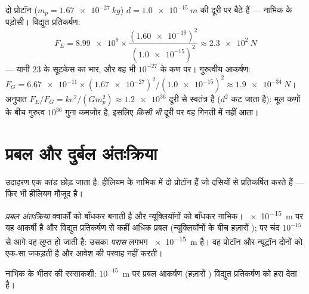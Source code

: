 \begin{example}[दो प्रोटॉन, दोनों बल एक साथ]\label{ex:g11:fundamental-interactions:protons}
दो प्रोटॉन ($m_p = \qty{1.67e-27}{kg}$) $d = \qty{1.0e-15}{m}$ की दूरी पर बैठे हैं --- नाभिक के पड़ोसी। विद्युत
प्रतिकर्षण:
\[
F_E = \num{8.99e9} \times
\frac{(\num{1.60e-19})^{2}}{(\num{1.0e-15})^{2}}
\approx \qty{2.3e2}{N}
\]
--- यानी $23$  के सूटकेस का भार, और वह भी $10^{-27}$
 के कण पर। गुरुत्वीय आकर्षण: $F_G = \num{6.67e-11} \times (\num{1.67e-27})^{2} /
(\num{1.0e-15})^{2} \approx \qty{1.9e-34}{N}$। अनुपात $F_E / F_G = k e^{2} / (G m_p^{2}) \approx \num{1.2e36}$ दूरी से
स्वतंत्र है ($d^{2}$ कट जाता है): मूल कणों के बीच गुरुत्व $10^{36}$ गुना कमज़ोर
है, इसलिए \emph{किसी भी} दूरी पर वह गिनती में नहीं आता।
\end{example}

\section{प्रबल और दुर्बल अंतःक्रिया}

उदाहरण एक कांड छोड़ जाता है: हीलियम के नाभिक में दो प्रोटॉन हैं जो
दसियों  से प्रतिकर्षित करते हैं --- फिर भी हीलियम मौजूद है।

\begin{definition}[प्रबल अंतःक्रिया]\label{def:g11:fundamental-interactions:strong}
\emph{प्रबल अंतःक्रिया} क्वार्कों को बाँधकर
 बनाती है और न्यूक्लियॉनों को बाँधकर नाभिक।
\qty{e-15}{m} पर यह आकर्षी है और विद्युत प्रतिकर्षण से कहीं अधिक प्रबल
(न्यूक्लियॉनों के बीच हज़ारों ); पर चंद $10^{-15}$
 से आगे वह लुप्त हो जाती है: उसका
\emph{परास} लगभग \qty{e-15}{m} है। वह प्रोटॉन और
न्यूट्रॉन दोनों को एक-सा जकड़ती है और आवेश की परवाह नहीं करती।
\end{definition}

\begin{omfigure}

{\small नाभिक के भीतर की रस्साकशी: $10^{-15}$~m पर प्रबल आकर्षण (हज़ारों
) विद्युत प्रतिकर्षण को हरा देता है।}
\end{omfigure}

